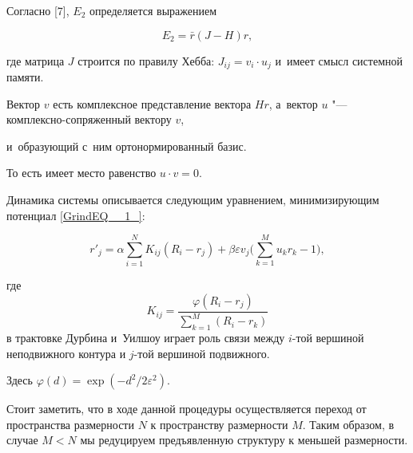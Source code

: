 Согласно [7], $E_{2} $ определяется выражением

\begin{equation} \label{GrindEQ__3_}

E_{2} =\bar{r}\left(J-H\right)r,

\end{equation}

где матрица $J$ строится по правилу Хебба: $J_{ij} =v_{i} \cdot u_{j} $ и~имеет смысл системной памяти.

Вектор $v$ есть комплексное представление вектора $Hr$, а~вектор $u$ "--- комплексно-сопряженный вектору $v$,

и~образующий с~ним ортонормированный базис.

То есть имеет место равенство $u\cdot v=0$.



Динамика системы описывается следующим уравнением, минимизирующим потенциал \eqref{GrindEQ__1_}:

\begin{equation} \label{GrindEQ__4_}

r'_{j} =\alpha \sum _{i=1}^{N}K_{ij} \left(R_{i} -r_{j} \right)+\beta \varepsilon v_{j} \Biggl(\sum _{k=1}^{M}u_{k} r_{k} -1 \Biggr) ,

\end{equation}

где $$K_{ij} =\frac{\varphi \left(R_{i} -r_{j} \right)}{\sum _{k=1}^{M}\left(R_{i} -r_{k} \right) } $$ в трактовке Дурбина и~Уилшоу играет роль связи между $i$-той вершиной неподвижного контура и $j$-той вершиной подвижного.

Здесь $\varphi (d)=\exp(-d^2/2\varepsilon^2)$.



Стоит заметить, что в ходе данной процедуры осуществляется переход от пространства размерности $N$ к пространству размерности $M$. Таким образом, в случае $M<N$ мы редуцируем предъявленную структуру к меньшей размерности.





